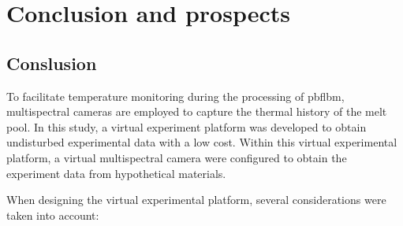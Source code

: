 \chapter{Conclusion and prospects}
\section*{Conslusion}
To facilitate temperature monitoring during the processing of \gls{pbflbm}, multispectral cameras are 
employed to capture the thermal history of the melt pool. In this study, a virtual experiment 
platform was developed to obtain undisturbed experimental data with a low cost. Within this virtual experimental 
platform, a virtual multispectral camera were configured to obtain the experiment data from hypothetical materials.

When designing the virtual experimental platform, several considerations were taken into account:

